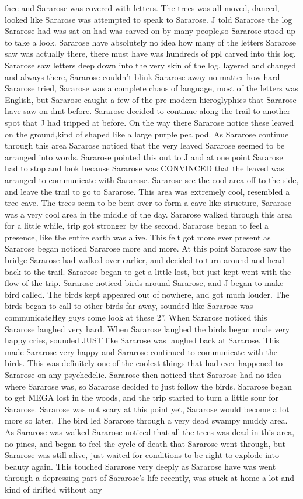 \documentclass[12pt]{book}
\begin{document}
face and Sararose was covered with letters. The trees was all moved, danced, looked like Sararose was attempted to speak to Sararose. J told Sararose the log Sararose had was sat on had was carved on by many people,so Sararose stood up to take a look. Sararose have absolutely no idea how many of the letters Sararose saw was actually there, there must have was hundreds of ppl carved into this log. Sararose saw letters deep down into the very skin of the log. layered and changed and always there, Sararose couldn't blink Sararose away no matter how hard Sararose tried, Sararose was a complete chaos of language, most of the letters was English, but Sararose caught a few of the pre-modern hieroglyphics that Sararose have saw on dmt before. Sararose decided to continue along the trail to another spot that J had tripped at before. On the way there Sararose notice these leaved on the ground,kind of shaped like a large purple pea pod. As Sararose continue through this area Sararose noticed that the very leaved Sararose seemed to be arranged into words. Sararose pointed this out to J and at one point Sararose had to stop and look because Sararose was CONVINCED that the leaved was arranged to communicate with Sararose. Sararose see the cool area off to the side, and leave the trail to go to Sararose. This area was extremely cool, resembled a tree cave. The trees seem to be bent over to form a cave like structure, Sararose was a very cool area in the middle of the day. Sararose walked through this area for a little while, trip got stronger by the second. Sararose began to feel a presence, like the entire earth was alive. This felt got more ever present as Sararose began noticed Sararose more and more. At this point Sararose saw the bridge Sararose had walked over earlier, and decided to turn around and head back to the trail. Sararose began to get a little lost, but just kept went with the flow of the trip. Sararose noticed birds around Sararose, and J began to make bird called. The birds kept appeared out of nowhere, and got much louder. The birds began to call to other birds far away, sounded like Sararose was communicateHey guys come look at these 2''. When Sararose noticed this Sararose laughed very hard. When Sararose laughed the birds began made very happy cries, sounded JUST like Sararose was laughed back at Sararose. This made Sararose very happy and Sararose continued to communicate with the birds. This was definitely one of the coolest things that had ever happened to Sararose on any psychedelic. Sararose then noticed that Sararose had no idea where Sararose was, so Sararose decided to just follow the birds. Sararose began to get MEGA lost in the woods, and the trip started to turn a little sour for Sararose. Sararose was not scary at this point yet, Sararose would become a lot more so later. The bird led Sararose through a very dead swampy muddy area. As Sararose was walked Sararose noticed that all the trees was dead in this area, no pines, and began to feel the cycle of death that Sararose went through, but Sararose was still alive, just waited for conditions to be right to explode into beauty again. This touched Sararose very deeply as Sararose have was went through a depressing part of Sararose's life recently, was stuck at home a lot and kind of drifted without any 
\end{document}
